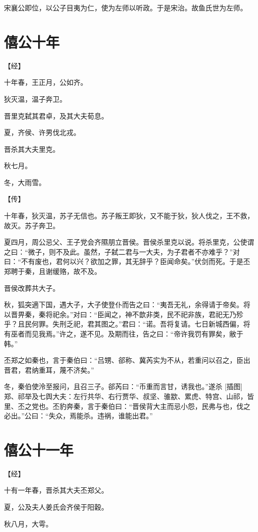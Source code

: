 \documentclass[a4paper,12pt,UTF8,twoside]{ctexbook}
\begin{document}
宋襄公即位，以公子目夷为仁，使为左师以听政。于是宋治。故鱼氏世为左师。

\chapter{僖公十年}



【经】

十年春，王正月，公如齐。

狄灭温，温子奔卫。

晋里克弑其君卓，及其大夫荀息。

夏，齐侯、许男伐北戎。

晋杀其大夫里克。

秋七月。

冬，大雨雪。

【传】

十年春，狄灭温，苏子无信也。苏子叛王即狄，又不能于狄，狄人伐之，王不救，故灭。苏子奔卫。

夏四月，周公忌父、王子党会齐隰朋立晋侯。晋侯杀里克以说。将杀里克，公使谓之曰：“微子，则不及此。虽然，子弑二君与一大夫，为子君者不亦难乎？”对曰：“不有废也，君何以兴？欲加之罪，其无辞乎？臣闻命矣。”伏剑而死。于是丕郑聘于秦，且谢缓赂，故不及。

晋侯改葬共大子。

秋，狐突適下国，遇大子，大子使登仆而告之曰：“夷吾无礼，余得请于帝矣。将以晋畀秦，秦将祀余。”对曰：“臣闻之，神不歆非类，民不祀非族，君祀无乃殄乎？且民何罪。失刑乏祀，君其图之。”君曰：“诺。吾将复请。七日新城西偏，将有巫者而见我焉。”许之，遂不见。及期而往，告之曰：“帝许我罚有罪矣，敝于韩。”

丕郑之如秦也，言于秦伯曰：“吕甥、郤称、冀芮实为不从，若重问以召之，臣出晋君，君纳重耳，蔑不济矣。”

冬，秦伯使泠至报问，且召三子。郤芮曰：“币重而言甘，诱我也。”遂杀 [插图]郑、祁举及七舆大夫：左行共华、右行贾华、叔坚、骓歂、累虎、特宫、山祁，皆里、丕之党也。丕豹奔秦，言于秦伯曰：“晋侯背大主而忌小怨，民弗与也，伐之必出。”公曰：“失众，焉能杀。违祸，谁能出君。”


\chapter{僖公十一年}


【经】

十有一年春，晋杀其大夫丕郑父。

夏，公及夫人姜氏会齐侯于阳穀。

秋八月，大雩。
\end{document}
